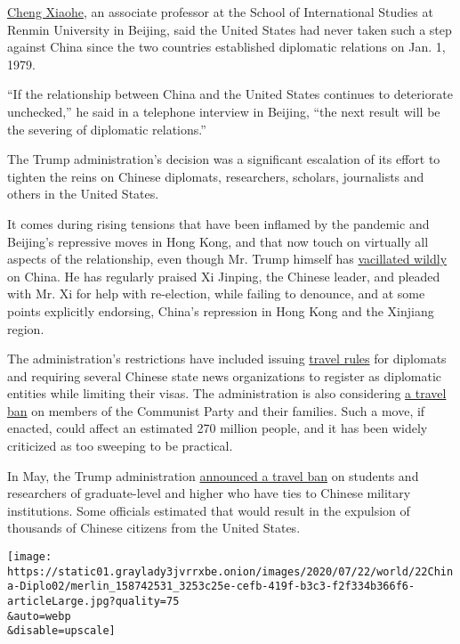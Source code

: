 \href{https://carnegietsinghua.org/experts/1536}{Cheng Xiaohe}, an
associate professor at the School of International Studies at Renmin
University in Beijing, said the United States had never taken such a
step against China since the two countries established diplomatic
relations on Jan. 1, 1979.

``If the relationship between China and the United States continues to
deteriorate unchecked,'' he said in a telephone interview in Beijing,
``the next result will be the severing of diplomatic relations.''

The Trump administration's decision was a significant escalation of its
effort to tighten the reins on Chinese diplomats, researchers, scholars,
journalists and others in the United States.

It comes during rising tensions that have been inflamed by the pandemic
and Beijing's repressive moves in Hong Kong, and that now touch on
virtually all aspects of the relationship, even though Mr. Trump himself
has
\href{https://www.nytimes3xbfgragh.onion/2020/06/18/us/politics/trump-china-bolton.html}{vacillated
wildly} on China. He has regularly praised Xi Jinping, the Chinese
leader, and pleaded with Mr. Xi for help with re-election, while failing
to denounce, and at some points explicitly endorsing, China's repression
in Hong Kong and the Xinjiang region.

The administration's restrictions have included issuing
\href{https://www.nytimes3xbfgragh.onion/2019/10/16/world/asia/china-state-department-diplomats.html}{travel
rules} for diplomats and requiring several Chinese state news
organizations to register as diplomatic entities while limiting their
visas. The administration is also considering
\href{https://www.nytimes3xbfgragh.onion/2020/07/15/us/politics/china-travel-ban.html}{a
travel ban} on members of the Communist Party and their families. Such a
move, if enacted, could affect an estimated 270 million people, and it
has been widely criticized as too sweeping to be practical.

In May, the Trump administration
\href{https://www.nytimes3xbfgragh.onion/2020/05/28/us/politics/china-hong-kong-trump-student-visas.html}{announced
a travel ban} on students and researchers of graduate-level and higher
who have ties to Chinese military institutions. Some officials estimated
that would result in the expulsion of thousands of Chinese citizens from
the United States.

\texttt{[image: https://static01.graylady3jvrrxbe.onion/images/2020/07/22/world/22China-Diplo02/merlin\_158742531\_3253c25e-cefb-419f-b3c3-f2f334b366f6-articleLarge.jpg?quality=75\\\&auto=webp\\\&disable=upscale]}

